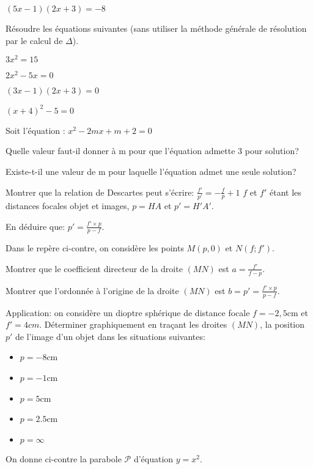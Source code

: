 \documentclass[a4paper,12pt]{scrartcl}
\begin{document}
\question{}
$(5x -1)(2x + 3) = -8$

\exo{}
Résoudre les équations suivantes (sans utiliser la méthode générale de résolution par le calcul de $\Delta$).

\question{}
$3x^2 = 15$

\question{}
$2x^2 - 5x = 0$

\question{}
$(3x - 1)(2x + 3) = 0$

\question{}
$(x+ 4)^2 - 5 = 0$

Soit l'équation :  $x^2 - 2m x + m + 2  = 0$

\question{}
Quelle valeur faut-il donner à m pour que l'équation admette 3 pour solution?

\question{}
Existe-t-il une valeur de m pour laquelle l'équation admet une seule solution?


\question{}
Montrer que la relation de Descartes peut s'écrire: $\frac{f'}{p'} = -\frac{f}{p} + 1$ $f$ et $f'$ étant les distances focales objet et images, $p = HA$ et $p' = H'A'$.

\question{}
En déduire que: $p' = \frac{f' \times p}{p-f}$.

\question{}
Dans le repère ci-contre, on considère les points $M(p,0)$ et $N(f ;f')$.

\subquestion{}
Montrer que le coefficient directeur de la droite $(MN)$ est $a = \frac{f'}{f-p}$.

\subquestion{}
Montrer que l'ordonnée à l'origine de la droite $(MN)$ est $b = p' = \frac{f' \times p}{p-f}$.

\question{}
Application: on considère un dioptre sphérique de distance focale $f = -2,5$cm et $f' = 4 cm$.
Déterminer graphiquement en traçant les droites $(MN)$, la position $p'$ de l'image d'un objet dans les situations suivantes: 

\begin{itemize}
\item $p = -8$cm
\item $p = -1$cm
\item $p = 5$cm
\item $p = 2.5$cm
\item $p = \infty$
\end{itemize}


On donne ci-contre la parabole $\mathcal{P}$ d'équation $y = x^2$.
\end{document}
